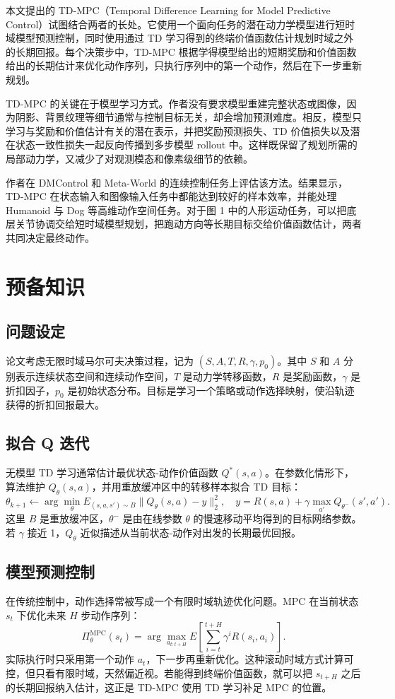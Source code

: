 \documentclass[10pt]{article}
\begin{document}
本文提出的 TD-MPC（Temporal Difference Learning for Model Predictive Control）试图结合两者的长处。它使用一个面向任务的潜在动力学模型进行短时域模型预测控制，同时使用通过 TD 学习得到的终端价值函数估计规划时域之外的长期回报。每个决策步中，TD-MPC 根据学得模型给出的短期奖励和价值函数给出的长期估计来优化动作序列，只执行序列中的第一个动作，然后在下一步重新规划。

TD-MPC 的关键在于模型学习方式。作者没有要求模型重建完整状态或图像，因为阴影、背景纹理等细节通常与控制目标无关，却会增加预测难度。相反，模型只学习与奖励和价值估计有关的潜在表示，并把奖励预测损失、TD 价值损失以及潜在状态一致性损失一起反向传播到多步模型 rollout 中。这样既保留了规划所需的局部动力学，又减少了对观测模态和像素级细节的依赖。

作者在 DMControl 和 Meta-World 的连续控制任务上评估该方法。结果显示，TD-MPC 在状态输入和图像输入任务中都能达到较好的样本效率，并能处理 Humanoid 与 Dog 等高维动作空间任务。对于图 1 中的人形运动任务，可以把底层关节协调交给短时域模型规划，把跑动方向等长期目标交给价值函数估计，两者共同决定最终动作。

\section{预备知识}
\subsection*{问题设定}
论文考虑无限时域马尔可夫决策过程，记为 $(S,A,T,R,\gamma,p_0)$。其中 $S$ 和 $A$ 分别表示连续状态空间和连续动作空间，$T$ 是动力学转移函数，$R$ 是奖励函数，$\gamma$ 是折扣因子，$p_0$ 是初始状态分布。目标是学习一个策略或动作选择映射，使沿轨迹获得的折扣回报最大。

\subsection*{拟合 Q 迭代}
无模型 TD 学习通常估计最优状态-动作价值函数 $Q^\ast(s,a)$。在参数化情形下，算法维护 $Q_\theta(s,a)$，并用重放缓冲区中的转移样本拟合 TD 目标：
\[
\theta_{k+1}\leftarrow \arg\min_\theta E_{(s,a,s')\sim B}\|Q_\theta(s,a)-y\|_2^2,\quad
y=R(s,a)+\gamma\max_{a'}Q_{\theta^-}(s',a').
\]
这里 $B$ 是重放缓冲区，$\theta^-$ 是由在线参数 $\theta$ 的慢速移动平均得到的目标网络参数。若 $\gamma$ 接近 1，$Q_\theta$ 近似描述从当前状态-动作对出发的长期最优回报。

\subsection*{模型预测控制}
在传统控制中，动作选择常被写成一个有限时域轨迹优化问题。MPC 在当前状态 $s_t$ 下优化未来 $H$ 步动作序列：
\[
\Pi_\theta^{\mathrm{MPC}}(s_t)=
\arg\max_{a_{t:t+H}} E\left[\sum_{i=t}^{t+H}\gamma^i R(s_i,a_i)\right].
\]
实际执行时只采用第一个动作 $a_t$，下一步再重新优化。这种滚动时域方式计算可控，但只看有限时域，天然偏近视。若能得到终端价值函数，就可以把 $s_{t+H}$ 之后的长期回报纳入估计，这正是 TD-MPC 使用 TD 学习补足 MPC 的位置。
\end{document}
